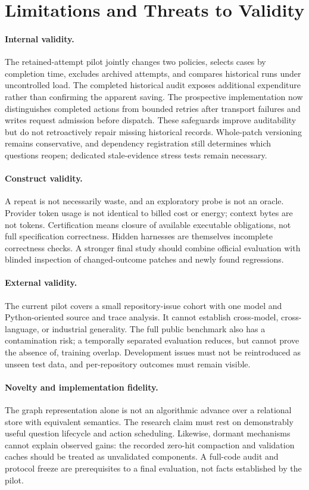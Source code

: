 \documentclass[acmsmall,screen,review,anonymous]{acmart}
\begin{document}
\section{Limitations and Threats to Validity}
\paragraph{Internal validity.}
The retained-attempt pilot jointly changes two policies, selects cases by completion time, excludes archived attempts, and compares historical runs under uncontrolled load. The completed historical audit exposes additional expenditure rather than confirming the apparent saving. The prospective implementation now distinguishes completed actions from bounded retries after transport failures and writes request admission before dispatch. These safeguards improve auditability but do not retroactively repair missing historical records. Whole-patch versioning remains conservative, and dependency registration still determines which questions reopen; dedicated stale-evidence stress tests remain necessary.

\paragraph{Construct validity.}
A repeat is not necessarily waste, and an exploratory probe is not an oracle. Provider token usage is not identical to billed cost or energy; context bytes are not tokens. Certification means closure of available executable obligations, not full specification correctness. Hidden harnesses are themselves incomplete correctness checks. A stronger final study should combine official evaluation with blinded inspection of changed-outcome patches and newly found regressions.

\paragraph{External validity.}
The current pilot covers a small repository-issue cohort with one model and Python-oriented source and trace analysis. It cannot establish cross-model, cross-language, or industrial generality. The full public benchmark also has a contamination risk; a temporally separated evaluation reduces, but cannot prove the absence of, training overlap. Development issues must not be reintroduced as unseen test data, and per-repository outcomes must remain visible.

\paragraph{Novelty and implementation fidelity.}
The graph representation alone is not an algorithmic advance over a relational store with equivalent semantics. The research claim must rest on demonstrably useful question lifecycle and action scheduling. Likewise, dormant mechanisms cannot explain observed gains: the recorded zero-hit compaction and validation caches should be treated as unvalidated components. A full-code audit and protocol freeze are prerequisites to a final evaluation, not facts established by the pilot.
\end{document}
